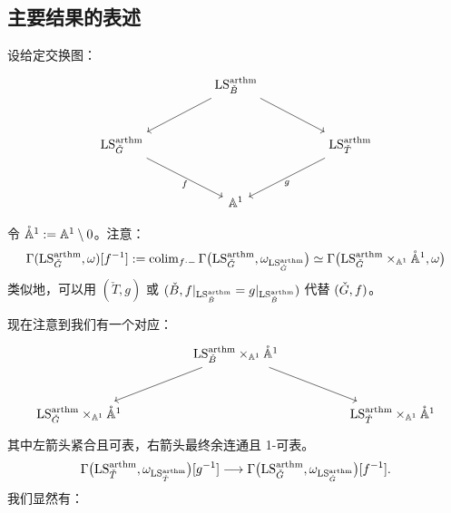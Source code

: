 \subsection{主要结果的表述}


设给定交换图：
\[
\begin{tikzcd}[column sep=huge, row sep=large]
  & \LS^{\arthm}_{\bB} \arrow[dl] \arrow[dr] & \\
  \LS^{\arthm}_{\bG} \arrow[dr, "f"{below}] & & \LS^{\arthm}_{\bT} \arrow[dl, "g"{below}] \\
  & \A^1 &
\end{tikzcd}
\]

令 $\mathring{\mathbb{A}}^1 := \mathbb{A}^1\setminus 0$。注意：
\[
  \Gamma(\mathrm{LS}^{\mathrm{arthm}}_{\check{G}},\omega)[f^{-1}]
  := \operatorname{colim}_{f\cdot-}\Gamma\bigl(\mathrm{LS}^{\mathrm{arthm}}_{\check{G}},\omega_{\mathrm{LS}^{\mathrm{arthm}}_{\check{G}}}\bigr)
  \simeq \Gamma\bigl(\mathrm{LS}^{\mathrm{arthm}}_{\check{G}}\times_{\mathbb{A}^1}\mathring{\mathbb{A}}^1,\omega\bigr)
\]
类似地，可以用 $(\check T,g)$ 或 $(\check B, f|_{\mathrm{LS}^{\mathrm{arthm}}_{\check B}} = g|_{\mathrm{LS}^{\mathrm{arthm}}_{\check B}})$ 代替 $(\check{G},f)$。

现在注意到我们有一个对应：
\begin{equation}
\begin{tikzcd}[column sep=huge, row sep=large]
  & \LS^{\arthm}_{\bB}\times_{\A^1}\mathring{\A}^1 \arrow[dl] \arrow[dr] & \\
  \LS^{\arthm}_{\bG}\times_{\A^1}\mathring{\A}^1 & & \LS^{\arthm}_{\bT}\times_{\A^1}\mathring{\A}^1
\end{tikzcd}
\end{equation}
其中左箭头紧合且可表，右箭头最终余连通且 1-可表。%
\begin{equation}
  \Gamma\bigl(\mathrm{LS}^{\mathrm{arthm}}_{\check{T}},\omega_{\mathrm{LS}^{\mathrm{arthm}}_{\check{T}}}\bigr)[g^{-1}]
  \longrightarrow
  \Gamma\bigl(\mathrm{LS}^{\mathrm{arthm}}_{\check{G}},\omega_{\mathrm{LS}^{\mathrm{arthm}}_{\check{G}}}\bigr)[f^{-1}].
\end{equation}
我们显然有：


